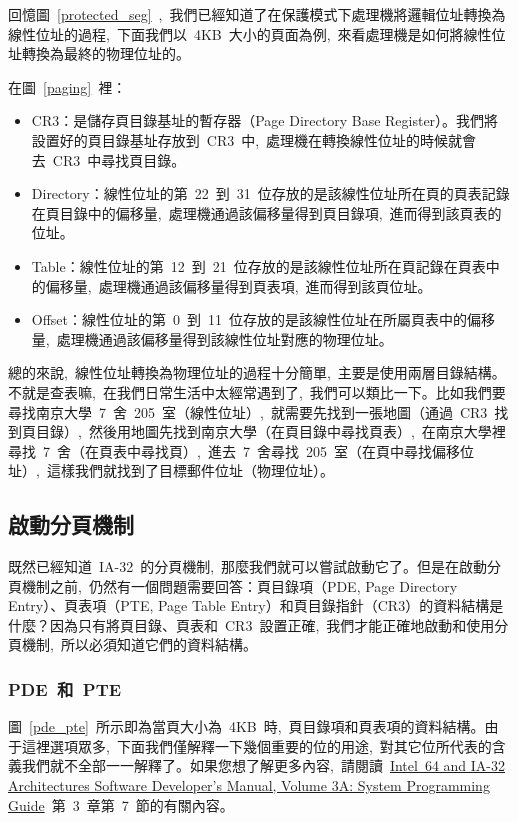 回憶圖~\ref{protected_seg}~,~我們已經知道了在保護模式下處理機將邏輯位址轉換為線性位址的過程,~下面我們以~4KB~大小的頁面為例,~來看處理機是如何將線性位址轉換為最終的物理位址的。


在圖~\ref{paging}~裡：
\begin{itemize}
\item CR3：是儲存頁目錄基址的暫存器（Page Directory Base Register）。我們將設置好的頁目錄基址存放到~CR3~中,~處理機在轉換線性位址的時候就會去~CR3~中尋找頁目錄。
\item Directory：線性位址的第~22~到~31~位存放的是該線性位址所在頁的頁表記錄在頁目錄中的偏移量,~處理機通過該偏移量得到頁目錄項,~進而得到該頁表的位址。
\item Table：線性位址的第~12~到~21~位存放的是該線性位址所在頁記錄在頁表中的偏移量,~處理機通過該偏移量得到頁表項,~進而得到該頁位址。
\item Offset：線性位址的第~0~到~11~位存放的是該線性位址在所屬頁表中的偏移量,~處理機通過該偏移量得到該線性位址對應的物理位址。
\end{itemize}

總的來說,~線性位址轉換為物理位址的過程十分簡單,~主要是使用兩層目錄結構。不就是查表嘛,~在我們日常生活中太經常遇到了,~我們可以類比一下。比如我們要尋找南京大學~7~舍~205~室（線性位址）,~就需要先找到一張地圖（通過~CR3~找到頁目錄）,~然後用地圖先找到南京大學（在頁目錄中尋找頁表）,~在南京大學裡尋找~7~舍（在頁表中尋找頁）,~進去~7~舍尋找~205~室（在頁中尋找偏移位址）,~這樣我們就找到了目標郵件位址（物理位址）。


\subsection{啟動分頁機制}

既然已經知道~IA-32~的分頁機制,~那麼我們就可以嘗試啟動它了。但是在啟動分頁機制之前,~仍然有一個問題需要回答：頁目錄項（PDE, Page Directory Entry）、頁表項（PTE, Page Table Entry）和頁目錄指針（CR3）的資料結構是什麼？因為只有將頁目錄、頁表和~CR3~設置正確,~我們才能正確地啟動和使用分頁機制,~所以必須知道它們的資料結構。

\subsubsection{PDE~和~PTE}

圖~\ref{pde_pte}~所示即為當頁大小為~4KB~時,~頁目錄項和頁表項的資料結構。由于這裡選項眾多,~下面我們僅解釋一下幾個重要的位的用途,~對其它位所代表的含義我們就不全部一一解釋了。如果您想了解更多內容,~請閱讀~\href{http://download.intel.com/design/processor/manuals/253668.pdf}{Intel\textregistered~64 and IA-32 Architectures Software Developer's Manual, Volume 3A: System Programming Guide}~第~3~章第~7~節的有關內容。

